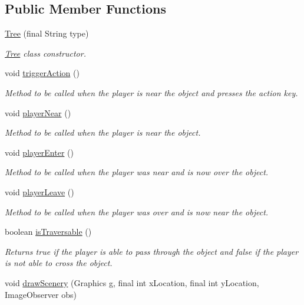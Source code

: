 \subsection*{Public Member Functions}
\begin{DoxyCompactItemize}
\item 
\hyperlink{classworld_1_1scenery_1_1_tree_a06acd38739c0360bbb1a30e59024d2ba}{Tree} (final String type)
\begin{DoxyCompactList}\small\item\em \hyperlink{classworld_1_1scenery_1_1_tree}{Tree} class constructor. \end{DoxyCompactList}\item 
void \hyperlink{classworld_1_1scenery_1_1_tree_a273e28b5881ded9ee71e59d6d5733e70}{trigger\-Action} ()
\begin{DoxyCompactList}\small\item\em Method to be called when the player is near the object and presses the action key. \end{DoxyCompactList}\item 
void \hyperlink{classworld_1_1scenery_1_1_tree_ad77fdbe4c5134b565dbee2acb74a937d}{player\-Near} ()
\begin{DoxyCompactList}\small\item\em Method to be called when the player is near the object. \end{DoxyCompactList}\item 
void \hyperlink{classworld_1_1scenery_1_1_tree_acfcba6dd6fbd6cebb54b4bbfe22b071e}{player\-Enter} ()
\begin{DoxyCompactList}\small\item\em Method to be called when the player was near and is now over the object. \end{DoxyCompactList}\item 
void \hyperlink{classworld_1_1scenery_1_1_tree_a41f658609a997f04252ac1f602ed4ac7}{player\-Leave} ()
\begin{DoxyCompactList}\small\item\em Method to be called when the player was over and is now near the object. \end{DoxyCompactList}\item 
boolean \hyperlink{classworld_1_1scenery_1_1_tree_adb76d3bf389981034e765c0c0f29de6a}{is\-Traversable} ()
\begin{DoxyCompactList}\small\item\em Returns true if the player is able to pass through the object and false if the player is not able to cross the object. \end{DoxyCompactList}\item 
void \hyperlink{classworld_1_1scenery_1_1_scenery_a626c1ae7fa15d2f96d564c35368fdbc9}{draw\-Scenery} (Graphics g, final int x\-Location, final int y\-Location, Image\-Observer obs)
\end{DoxyCompactItemize}
